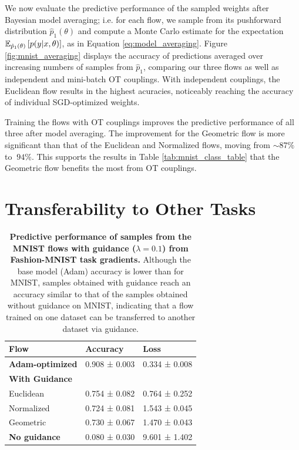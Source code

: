 We now evaluate the predictive performance of the sampled weights after Bayesian model averaging; i.e. for each flow, we sample from its pushforward distribution $\hat p_1 (\theta)$ and compute a Monte Carlo estimate for the expectation $\mathbb{E}_{\hat p_1 (\theta)} \left[ p(y\vert x, \theta) \right]$, as in Equation \ref{eq:model_averaging}. Figure \ref{fig:mnist_averaging} displays the accuracy of predictions averaged over increasing numbers of samples from $\hat p_1$, comparing our three flows as well as independent and mini-batch OT couplings. With independent couplings, the Euclidean flow results in the highest acuracies, noticeably reaching the accuracy of individual SGD-optimized weights. 

Training the flows with OT couplings improves the predictive performance of all three after model averaging. The improvement for the Geometric flow is more significant than that of the Euclidean and Normalized flows, moving from $\sim87\%$ to $~94\%$. This supports the results in Table \ref{tab:mnist_class_table} that the Geometric flow benefits the most from OT couplings. 

\section{Transferability to Other Tasks} \label{sec:task_generalization}

\begin{table}[t!]
    \centering
    \begin{tabular}{lll}
        \toprule
        \textbf{Flow} & \textbf{Accuracy} & \textbf{Loss} \\
        \midrule
        \textbf{Adam-optimized} & 0.908 ± 0.003 & 0.334 ± 0.008 \\
        \midrule
        \textbf{With Guidance} & & \\
        Euclidean   & 0.754 ± 0.082     & 0.764 ± 0.252 \\
        Normalized  & 0.724 ± 0.081     & 1.543 ± 0.045 \\
        Geometric   & 0.730 ± 0.067     & 1.470 ± 0.043 \\
        \midrule
        \textbf{No guidance} & 0.080 ± 0.030 & 9.601 ± 1.402 \\ 
        \bottomrule
    \end{tabular}
    \caption{\label{tab:mnist_generalization}\textbf{Predictive performance of samples from the MNIST flows with guidance ($\lambda = 0.1$) from Fashion-MNIST task gradients.} Although the base model (Adam) accuracy is lower than for MNIST, samples obtained with guidance reach an accuracy similar to that of the samples obtained without guidance on MNIST, indicating that a flow trained on one dataset can be transferred to another dataset via guidance. }
\end{table}


